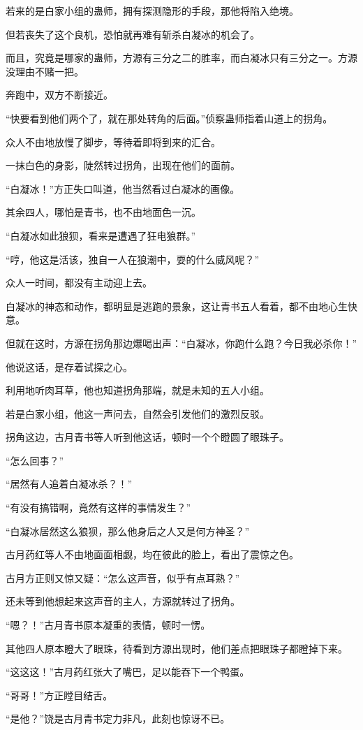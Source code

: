 \begin{this_body}
若来的是白家小组的蛊师，拥有探测隐形的手段，那他将陷入绝境。

但若丧失了这个良机，恐怕就再难有斩杀白凝冰的机会了。

而且，究竟是哪家的蛊师，方源有三分之二的胜率，而白凝冰只有三分之一。方源没理由不赌一把。

奔跑中，双方不断接近。

“快要看到他们两个了，就在那处转角的后面。”侦察蛊师指着山道上的拐角。

众人不由地放慢了脚步，等待着即将到来的汇合。

一抹白色的身影，陡然转过拐角，出现在他们的面前。

“白凝冰！”方正失口叫道，他当然看过白凝冰的画像。

其余四人，哪怕是青书，也不由地面色一沉。

“白凝冰如此狼狈，看来是遭遇了狂电狼群。”

“哼，他这是活该，独自一人在狼潮中，耍的什么威风呢？”

众人一时间，都没有主动迎上去。

白凝冰的神态和动作，都明显是逃跑的景象，这让青书五人看着，都不由地心生快意。

但就在这时，方源在拐角那边爆喝出声：“白凝冰，你跑什么跑？今日我必杀你！”

他说这话，是存着试探之心。

利用地听肉耳草，他也知道拐角那端，就是未知的五人小组。

若是白家小组，他这一声问去，自然会引发他们的激烈反驳。

拐角这边，古月青书等人听到他这话，顿时一个个瞪圆了眼珠子。

“怎么回事？”

“居然有人追着白凝冰杀？！”

“有没有搞错啊，竟然有这样的事情发生？”

“白凝冰居然这么狼狈，那么他身后之人又是何方神圣？”

古月药红等人不由地面面相觑，均在彼此的脸上，看出了震惊之色。

古月方正则又惊又疑：“怎么这声音，似乎有点耳熟？”

还未等到他想起来这声音的主人，方源就转过了拐角。

“嗯？！”古月青书原本凝重的表情，顿时一愣。

其他四人原本瞪大了眼珠，待看到方源出现时，他们差点把眼珠子都瞪掉下来。

“这这这！”古月药红张大了嘴巴，足以能吞下一个鸭蛋。

“哥哥！”方正瞠目结舌。

“是他？”饶是古月青书定力非凡，此刻也惊讶不已。

\end{this_body}

